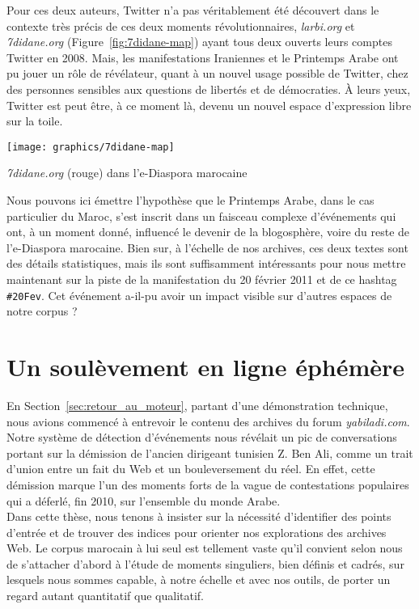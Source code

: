 \documentclass[symmetric,justified,marginals=raggedouter]{tufte-book}
\begin{document}
Pour ces deux auteurs, Twitter n'a pas véritablement été découvert dans le contexte très précis de ces deux moments révolutionnaires, \textit{larbi.org} et \textit{7didane.org} (Figure~\ref{fig:7didane-map}) ayant tous deux ouverts leurs comptes Twitter en 2008. Mais, les manifestations Iraniennes et le Printemps Arabe ont pu jouer un rôle de révélateur, quant à un nouvel usage possible de Twitter, chez des personnes sensibles aux questions de libertés et de démocraties. À leurs yeux, Twitter est peut être, à ce moment là, devenu un nouvel espace d'expression libre sur la toile. 

\begin{marginfigure}%
  \texttt{[image: graphics/7didane-map]}
  \vspace*{0.2cm}  
  \caption{\textit{7didane.org} (rouge) dans l'e-Diaspora marocaine}
  \label{fig:7didane-map}
\end{marginfigure} 

Nous pouvons ici émettre l'hypothèse que le Printemps Arabe, dans le cas particulier du Maroc, s'est inscrit dans un faisceau complexe d'événements qui ont, à un moment donné, influencé le devenir de la blogosphère, voire du reste de l'e-Diaspora marocaine. Bien sur, à l'échelle de nos archives, ces deux textes sont des détails statistiques, mais ils sont suffisamment intéressants pour nous mettre maintenant sur la piste de la manifestation du 20 février 2011 et de ce hashtag \texttt{\#20Fev}. Cet événement a-il-pu avoir un impact visible sur d'autres espaces de notre corpus ?

\section{Un soulèvement en ligne éphémère}
\label{sec:6_printemps}

\noindent En Section~\ref{sec:retour_au_moteur}, partant d'une démonstration technique, nous avions commencé à entrevoir le contenu des archives du forum \textit{yabiladi.com}. Notre système de détection d'événements nous révélait un pic de conversations portant sur la démission de l'ancien dirigeant tunisien Z. Ben Ali, comme un trait d'union entre un fait du Web et un bouleversement du réel. En effet, cette démission marque l'un des moments forts de la vague de contestations populaires qui a déferlé, fin 2010, sur l'ensemble du monde Arabe.\\

Dans cette thèse, nous tenons à insister sur la nécessité d'identifier des points d'entrée et de trouver des indices pour orienter nos explorations des archives Web. Le corpus marocain à lui seul est tellement vaste qu'il convient selon nous de s'attacher d'abord à l'étude de moments singuliers, bien définis et cadrés, sur lesquels nous sommes capable, à notre échelle et avec nos outils, de porter un regard autant quantitatif que qualitatif. 
\end{document}
